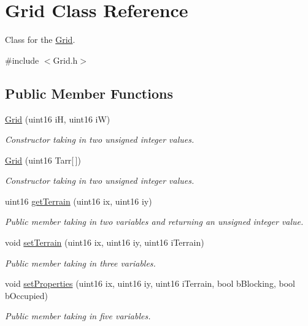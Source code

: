 \hypertarget{class_grid}{}\section{Grid Class Reference}
\label{class_grid}


Class for the \hyperlink{class_grid}{Grid}.  




{\ttfamily \#include $<$Grid.\+h$>$}

\subsection*{Public Member Functions}
\begin{DoxyCompactItemize}
\item 
\hyperlink{class_grid_a3602235a1d7b17254b0219dc7b754456}{Grid} (uint16 iH, uint16 iW)
\begin{DoxyCompactList}\small\item\em Constructor taking in two unsigned integer values. \end{DoxyCompactList}\item 
\hyperlink{class_grid_a5c60d994d3dcfab965bf7b62d028a797}{Grid} (uint16 Tarr\mbox{[}$\,$\mbox{]})
\begin{DoxyCompactList}\small\item\em Constructor taking in two unsigned integer values. \end{DoxyCompactList}\item 
uint16 \hyperlink{class_grid_a165ea0d0c65632335dbe7df2bc34a030}{get\+Terrain} (uint16 ix, uint16 iy)
\begin{DoxyCompactList}\small\item\em Public member taking in two variables and returning an unsigned integer value. \end{DoxyCompactList}\item 
void \hyperlink{class_grid_a3feb00999e05825bbb470bdc098e05ab}{set\+Terrain} (uint16 ix, uint16 iy, uint16 i\+Terrain)
\begin{DoxyCompactList}\small\item\em Public member taking in three variables. \end{DoxyCompactList}\item 
void \hyperlink{class_grid_a4704642a117a8be8e9defdda92784303}{set\+Properties} (uint16 ix, uint16 iy, uint16 i\+Terrain, bool b\+Blocking, bool b\+Occupied)
\begin{DoxyCompactList}\small\item\em Public member taking in five variables. \end{DoxyCompactList}\item 

\end{DoxyCompactItemize}
